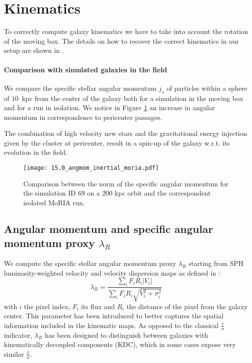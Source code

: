 
\section{Kinematics}
To correctly compute galaxy kinematics we have to take into account the rotation of the moving box.
The details on how to recover the correct kinematics in our setup are shown in .

\paragraph{Comparison with simulated galaxies in the field}
We compare the specific stellar angular momentum $j_s$ of particles within a sphere of $10$~kpc from the center of the galaxy both for a simulation in the moving box and for a run in isolation.
We notice in Figure \ref{fig:j_s_moria} an increase in angular momentum in correspondence to pericenter passages.

The combination of high velocity new stars and the gravitational energy injection given by the cluster at pericenter, result in a spin-up of the galaxy w.r.t. its evolution in the field.

\begin{figure}
\centering
\texttt{[image: 15.0\_angmom\_inertial\_moria.pdf]}
\caption{Comparison between the norm of the specific angular momentum for the simulation ID 69 on a 200 kpc orbit and the correspondent isolated MoRIA run.}
\label{fig:j_s_moria}
\end{figure}

\subsection{Angular momentum and specific angular momentum proxy $\lambda_R$}
We compute the specific stellar angular momentum proxy $\lambda_R$ starting from SPH luminosity-weighted velocity and velocity dispersion maps as defined in \citet{Emsellem2007}: %
\begin{equation}
 \lambda_R = \dfrac{\sum_i F_i R_i |V_i|}{\sum_i F_i R_i \sqrt{V_i^2 + \sigma_i^2}}
\end{equation}
with $i$ the pixel index, $F_i$ its flux and $R_i$ the distance of the pixel from the galaxy center.
This parameter has been introduced to better captures the spatial information included in the kinematic maps.
As opposed to the classical $\frac{v}{\sigma}$ indicator, $\lambda_R$ has been designed to distinguish between galaxies with kinematically decoupled components (KDC), which in some cases expose very similar $\frac{v}{\sigma}$.


